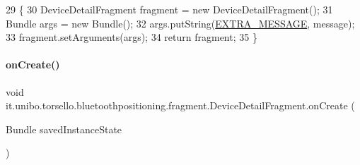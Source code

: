 \begin{DoxyCode}
29                                                                    \{
30         DeviceDetailFragment fragment = \textcolor{keyword}{new} DeviceDetailFragment();
31         Bundle args = \textcolor{keyword}{new} Bundle();
32         args.putString(\hyperlink{classit_1_1unibo_1_1torsello_1_1bluetoothpositioning_1_1fragment_1_1DeviceDetailFragment_a9f7fff4a2b22105976f2c7223d88f9ae_a9f7fff4a2b22105976f2c7223d88f9ae}{EXTRA\_MESSAGE}, message);
33         fragment.setArguments(args);
34         \textcolor{keywordflow}{return} fragment;
35     \}
\end{DoxyCode}
\hypertarget{classit_1_1unibo_1_1torsello_1_1bluetoothpositioning_1_1fragment_1_1DeviceDetailFragment_af33d782c107be10fe752f16f04cc5e5d_af33d782c107be10fe752f16f04cc5e5d}{}\label{classit_1_1unibo_1_1torsello_1_1bluetoothpositioning_1_1fragment_1_1DeviceDetailFragment_af33d782c107be10fe752f16f04cc5e5d_af33d782c107be10fe752f16f04cc5e5d} 
\paragraph{\texorpdfstring{on\+Create()}{onCreate()}}
{\footnotesize\ttfamily void it.\+unibo.\+torsello.\+bluetoothpositioning.\+fragment.\+Device\+Detail\+Fragment.\+on\+Create (\begin{DoxyParamCaption}\item[{Bundle}]{saved\+Instance\+State }\end{DoxyParamCaption})}



